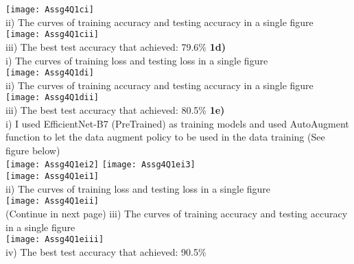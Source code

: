 \documentclass[12pt]{article}
\begin{document}
\texttt{[image: Assg4Q1ci]}\\
\indent ii) The curves of training accuracy and testing accuracy in a single figure\\
\texttt{[image: Assg4Q1cii]}\\
\indent iii) The best test accuracy that achieved: 79.6\%\newpage
\textbf{1d)}\\
\indent i) The curves of training loss and testing loss in a single figure\\
\texttt{[image: Assg4Q1di]}\\
\indent ii) The curves of training accuracy and testing accuracy in a single figure\\
\texttt{[image: Assg4Q1dii]}\\
\indent iii) The best test accuracy that achieved: 80.5\%\newpage
\textbf{1e)}\\
\indent i) I used EfficientNet-B7 (PreTrained) as training models and used AutoAugment function to let the data augment policy to be used in the data training (See figure below)\\
\texttt{[image: Assg4Q1ei2]}
\texttt{[image: Assg4Q1ei3]}\\
\texttt{[image: Assg4Q1ei1]}\\
\indent ii) The curves of training loss and testing loss in a single figure\\
\texttt{[image: Assg4Q1eii]}\\[0.5in](Continue in next page)\newpage
\indent iii) The curves of training accuracy and testing accuracy in a single figure\\
\texttt{[image: Assg4Q1eiii]}\\
\indent iv) The best test accuracy that achieved: 90.5\%\\
\end{document}
